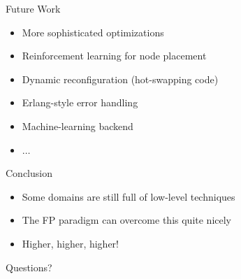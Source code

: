 \documentclass{beamer}
\begin{document}
  \begin{frame}{Future Work}
    \begin{itemize}
    \item More sophisticated optimizations
    \item Reinforcement learning for node placement
    \item Dynamic reconfiguration (hot-swapping code)
    \item Erlang-style error handling
    \item Machine-learning backend
    \item $\dots$
    \end{itemize}
  \end{frame}
  
  \begin{frame}{Conclusion}
    \begin{itemize}
    \item Some domains are still full of low-level techniques
    \item The FP paradigm can overcome this quite nicely
    \item Higher, higher, higher!
    \end{itemize}
  \end{frame}
  
  \begin{frame}[standout]
    Questions?
  \end{frame}
  
  	
\end{document}

